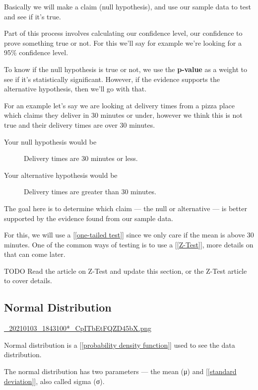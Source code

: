 \documentclass[11pt]{article}
\begin{document}
Basically we will make a claim (null hypothesis), and use our sample data to
test and see if it's true.

Part of this process involves calculating our confidence level, our confidence
to prove something true or not. For this we'll say for example we're looking for
a 95\% confidence level.

To know if the null hypothesis is true or not, we use the \textbf{p-value} as a weight to
see if it's statistically significant. However, if the evidence supports the
alternative hypothesis, then we'll go with that.

For an example let's say we are looking at delivery times from a pizza place
which claims they deliver in 30 minutes or under, however we think this is not
true and their delivery times are over 30 minutes.

\begin{description}
\item[{Your null hypothesis would be}] Delivery times are 30 minutes or less.
\item[{Your alternative hypothesis would be}] Delivery times are greater than 30 minutes.
\end{description}

The goal here is to determine which claim — the null or alternative — is better
supported by the evidence found from our sample data.

For this, we will use a [[\href{../202101031837-one\_tailed\_test.org}{one-tailed test}]] since we only care if the mean is
above 30 minutes. One of the common ways of testing is to use a [[\href{../202101031841-z\_test.org}{Z-Test}]], more
details on that can come later.

TODO Read the article on Z-Test and update this section, or the Z-Test article
to cover details.

\subsection*{Normal Distribution}
\label{sec:org85e31d4}
\href{../.attach/6d/949153-db6f-4802-8248-e155309e61b9/\_20210103\_1843100*\_CpITbEtFQZD45bX.png}{\_20210103\_1843100*\_CpITbEtFQZD45bX.png}

Normal distribution is a [[\href{../202101031947-probability\_density\_function.org}{probability density function}]] used to see the data
distribution.

The normal distribution has two parameters — the mean (μ) and [[\href{../202101031954-standard\_deviation.org}{standard deviation}]], also called sigma (σ).
\end{document}
